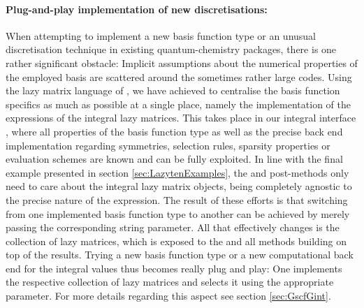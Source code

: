 \paragraph{Plug-and-play implementation of new discretisations:}
When attempting to implement a new basis function type or an unusual discretisation technique
in existing quantum-chemistry packages,
there is one rather significant obstacle:
Implicit assumptions about the numerical properties of the employed basis
are scattered around the sometimes rather large codes.
Using the lazy matrix language of \lazyten,
we have achieved to centralise the basis function specifics as much as possible
at a single place,
namely the implementation of the \contraction expressions
of the integral lazy matrices.
This takes place in our integral interface \gint,
where all properties of the basis function type
as well as the precise back end implementation
regarding symmetries, selection rules, sparsity properties
or evaluation schemes are known and can be fully exploited.
In line with the final example presented in section \vref{sec:LazytenExamples},
the \SCF and post-\HF methods only need to care about the
integral lazy matrix objects,
being completely agnostic to the precise nature of the \contraction expression.
The result of these efforts is that switching from one implemented
basis function type to another can be achieved by merely passing
the corresponding string parameter.
All that effectively changes is the collection of lazy matrices,
which is exposed to the \SCF and all methods building on top
of the \SCF results.
Trying a new basis function type
or a new computational back end for the integral values
thus becomes really plug and play:
One implements the respective collection of lazy matrices and selects
it using the appropriate parameter.
For more details regarding this aspect see section \vref{sec:GscfGint}.
%
%
